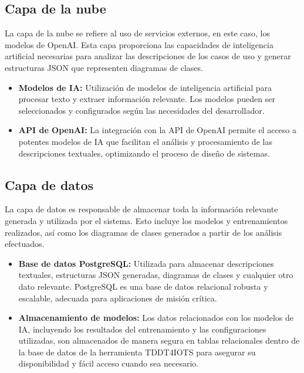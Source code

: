 \subsection{Capa de la nube}

La capa de la nube se refiere al uso de servicios externos, en este caso, los modelos de OpenAI. Esta capa proporciona las capacidades de inteligencia artificial necesarias para analizar las descripciones de los casos de uso y generar estructuras JSON que representen diagramas de clases.

\begin{itemize}
	\item \textbf{Modelos de IA:} Utilización de modelos de inteligencia artificial para procesar texto y extraer información relevante. Los modelos pueden ser seleccionados y configurados según las necesidades del desarrollador.
	\item \textbf{API de OpenAI:} La integración con la API de OpenAI permite el acceso a potentes modelos de IA que facilitan el análisis y procesamiento de las descripciones textuales, optimizando el proceso de diseño de sistemas.
\end{itemize}

\subsection{Capa de datos}

La capa de datos es responsable de almacenar toda la información relevante generada y utilizada por el sistema. Esto incluye los modelos y entrenamientos realizados, así como los diagramas de clases generados a partir de los análisis efectuados.

\begin{itemize}
	\item \textbf{Base de datos PostgreSQL:} Utilizada para almacenar descripciones textuales, estructuras JSON generadas, diagramas de clases y cualquier otro dato relevante. PostgreSQL es una base de datos relacional robusta y escalable, adecuada para aplicaciones de misión crítica.
	\item \textbf{Almacenamiento de modelos:} Los datos relacionados con los modelos de IA, incluyendo los resultados del entrenamiento y las configuraciones utilizadas, son almacenados de manera segura en tablas relacionales dentro de la base de datos de la herramienta TDDT4IOTS para asegurar su disponibilidad y fácil acceso cuando sea necesario.
\end{itemize}

